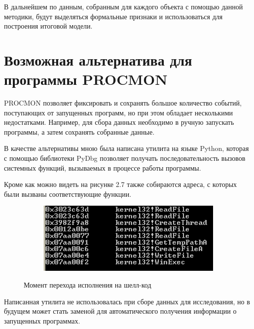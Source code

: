 В дальнейшем по данным, собранным для каждого объекта с помощью данной методики, будут выделяться формальные признаки и использоваться для построения итоговой модели.

\section{Возможная альтернатива для программы PROCMON}

PROCMON позволяет фиксировать и сохранять большое количество событий, поступающих от запущенных программ, но при этом обладает несколькими недостатками.
Например, для сбора данных необходимо в ручную запускать программы, а затем сохранять собранные данные.

В качестве альтернативы мною была написана утилита на языке Python, которая с помощью библиотеки PyDbg позволяет получать последовательность вызовов системных функций, вызываемых в процессе работы программы.

Кроме как можно видеть на рисунке 2.7 также собираются адреса, с которых были вызваны соответствующие функции.

\begin{figure}[ht]
    \centering
    \begin{subfigure}[b]{1\textwidth}
    \centering
        \includegraphics[scale=0.5]{tracer.png}        
    \end{subfigure}
 
    \caption{Момент перехода исполнения на шелл-код}
    \label{fig_parsetree}
\end{figure}

Написанная утилита не использовалась при сборе данных для исследования, но в будущем может стать заменой для автоматического получения информации о запущенных программах.
